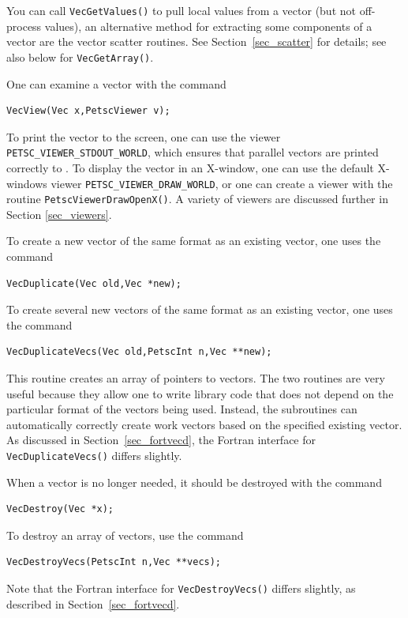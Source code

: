 You can call \lstinline{VecGetValues()} to pull local values from a vector (but
not off-process values),
an alternative method for extracting some components of a vector are
the vector scatter routines.
See Section~\ref{sec_scatter} for details; see also
below for \lstinline{VecGetArray()}.

One can examine a vector with the command
\begin{lstlisting}
VecView(Vec x,PetscViewer v);
\end{lstlisting}
To print the vector to the screen, one can use the viewer
\lstinline{PETSC_VIEWER_STDOUT_WORLD},
which ensures that parallel vectors are printed correctly to
. To display the vector in an X-window, one can use the
default X-windows viewer \lstinline{PETSC_VIEWER_DRAW_WORLD},
or one can create a viewer with the
routine \lstinline{PetscViewerDrawOpenX()}.  A variety of viewers are discussed
further in Section \ref{sec_viewers}.

To create a new vector of the same format as an existing vector, one uses
the command
\begin{lstlisting}
VecDuplicate(Vec old,Vec *new);
\end{lstlisting}
To create several new vectors of the same format as an existing vector,
one uses the command
\begin{lstlisting}
VecDuplicateVecs(Vec old,PetscInt n,Vec **new);
\end{lstlisting}
This routine creates an array of pointers to vectors. The two routines
are very useful because they allow one to write library code that does
not depend on the particular format of the vectors being used. Instead,
the subroutines can automatically correctly create work vectors
based on the specified existing vector.  As discussed in
Section~\ref{sec_fortvecd}, the Fortran interface for \lstinline{VecDuplicateVecs()}
differs slightly.

When a vector is no longer needed, it should be destroyed with the
command
\begin{lstlisting}
VecDestroy(Vec *x);
\end{lstlisting}
To destroy an array of vectors, use the command
\begin{lstlisting}
VecDestroyVecs(PetscInt n,Vec **vecs);
\end{lstlisting}
Note that the Fortran interface for \lstinline{VecDestroyVecs()} differs slightly,
as described in Section~\ref{sec_fortvecd}.

